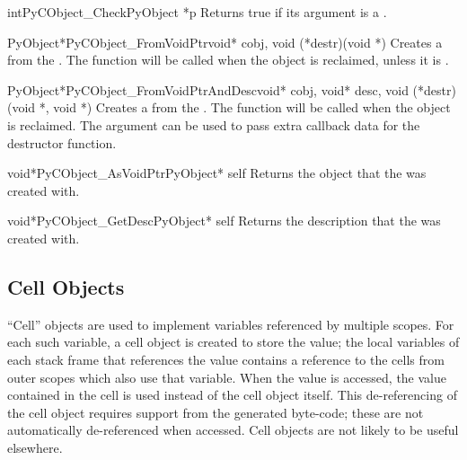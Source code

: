 \begin{cfuncdesc}{int}{PyCObject_Check}{PyObject *p}
  Returns true if its argument is a .
\end{cfuncdesc}

\begin{cfuncdesc}{PyObject*}{PyCObject_FromVoidPtr}{void* cobj,
                                                    void (*destr)(void *)}
  Creates a  from the .  The
   function will be called when the object is reclaimed,
  unless it is \NULL.
\end{cfuncdesc}

\begin{cfuncdesc}{PyObject*}{PyCObject_FromVoidPtrAndDesc}{void* cobj,
	                          void* desc, void (*destr)(void *, void *)}
  Creates a  from the .  The
   function will be called when the object is reclaimed.
  The  argument can be used to pass extra callback data for
  the destructor function.
\end{cfuncdesc}

\begin{cfuncdesc}{void*}{PyCObject_AsVoidPtr}{PyObject* self}
  Returns the object  that the 
   was created with.
\end{cfuncdesc}

\begin{cfuncdesc}{void*}{PyCObject_GetDesc}{PyObject* self}
  Returns the description  that the 
   was created with.
\end{cfuncdesc}


\subsection{Cell Objects \label{cell-objects}}

``Cell'' objects are used to implement variables referenced by
multiple scopes.  For each such variable, a cell object is created to
store the value; the local variables of each stack frame that
references the value contains a reference to the cells from outer
scopes which also use that variable.  When the value is accessed, the
value contained in the cell is used instead of the cell object
itself.  This de-referencing of the cell object requires support from
the generated byte-code; these are not automatically de-referenced
when accessed.  Cell objects are not likely to be useful elsewhere.

